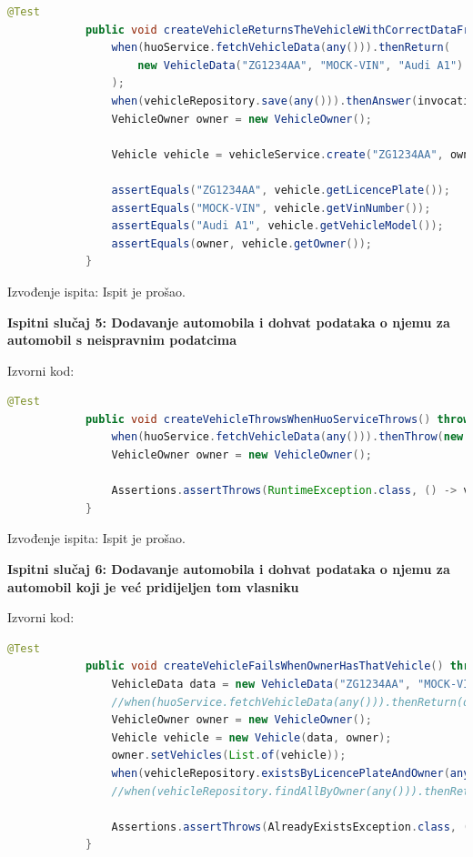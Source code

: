 			\begin{lstlisting}[language=Java]
			@Test
			public void createVehicleReturnsTheVehicleWithCorrectDataFromHuoServiceAndOwner() throws HuoServiceException {
				when(huoService.fetchVehicleData(any())).thenReturn(
					new VehicleData("ZG1234AA", "MOCK-VIN", "Audi A1")
				);
				when(vehicleRepository.save(any())).thenAnswer(invocation -> invocation.getArgument(0));
				VehicleOwner owner = new VehicleOwner();
				
				Vehicle vehicle = vehicleService.create("ZG1234AA", owner);
				
				assertEquals("ZG1234AA", vehicle.getLicencePlate());
				assertEquals("MOCK-VIN", vehicle.getVinNumber());
				assertEquals("Audi A1", vehicle.getVehicleModel());
				assertEquals(owner, vehicle.getOwner());
			}
			\end{lstlisting}
			
			\noindent Izvođenje ispita: Ispit je prošao.
			
			\hfill\break
			\noindent\textbf{Ispitni slučaj 5: Dodavanje automobila i dohvat podataka o njemu za automobil s neispravnim podatcima}
			
			\noindent Izvorni kod:
			
			\begin{lstlisting}[language=Java]
			@Test
			public void createVehicleThrowsWhenHuoServiceThrows() throws HuoServiceException {
				when(huoService.fetchVehicleData(any())).thenThrow(new HuoServiceException());
				VehicleOwner owner = new VehicleOwner();
				
				Assertions.assertThrows(RuntimeException.class, () -> vehicleService.create("ZG1234AA", owner));
			}
			\end{lstlisting}
			
			\noindent Izvođenje ispita: Ispit je prošao.
			
			\hfill\break
			\noindent\textbf{Ispitni slučaj 6: Dodavanje automobila i dohvat podataka o njemu za automobil koji je već pridijeljen tom vlasniku}
			
			\noindent Izvorni kod:
			
			\begin{lstlisting}[language=Java]
			@Test
			public void createVehicleFailsWhenOwnerHasThatVehicle() throws HuoServiceException {
				VehicleData data = new VehicleData("ZG1234AA", "MOCK-VIN", "Audi A1");
				//when(huoService.fetchVehicleData(any())).thenReturn(data);
				VehicleOwner owner = new VehicleOwner();
				Vehicle vehicle = new Vehicle(data, owner);
				owner.setVehicles(List.of(vehicle));
				when(vehicleRepository.existsByLicencePlateAndOwner(any(), any())).thenReturn(true);
				//when(vehicleRepository.findAllByOwner(any())).thenReturn(List.of(vehicle));
				
				Assertions.assertThrows(AlreadyExistsException.class, () -> vehicleService.create("ZG1234AA", owner));
			}
			\end{lstlisting}
			
